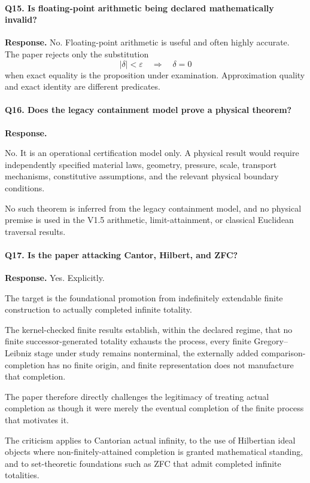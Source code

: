 \documentclass[11pt,a4paper]{article}
\begin{document}
\paragraph{Q15. Is floating-point arithmetic being declared mathematically invalid?}

\textbf{Response.}
No. Floating-point arithmetic is useful and often highly accurate. The
paper rejects only the substitution
\[
|\delta|<\varepsilon
\quad\Longrightarrow\quad
\delta=0
\]
when exact equality is the proposition under examination. Approximation
quality and exact identity are different predicates.

\paragraph{Q16. Does the legacy containment model prove a physical theorem?}

\textbf{Response.}

No.  It is an operational certification model only.  A physical result
would require independently specified material laws, geometry,
pressure, scale, transport mechanisms, constitutive assumptions, and
the relevant physical boundary conditions.

No such theorem is inferred from the legacy containment model, and no
physical premise is used in the V1.5 arithmetic, limit-attainment, or
classical Euclidean traversal results.

\paragraph{Q17. Is the paper attacking Cantor, Hilbert, and ZFC?}

\textbf{Response.}
Yes. Explicitly.

The target is the foundational promotion from indefinitely extendable
finite construction to actually completed infinite totality.

The kernel-checked finite results establish, within the declared
regime, that no finite successor-generated totality exhausts the
process, every finite Gregory--Leibniz stage under study remains
nonterminal, the externally added comparison-completion has no finite origin, and
finite representation does not manufacture that completion.

The paper therefore directly challenges the legitimacy of treating
actual completion as though it were merely the eventual completion of
the finite process that motivates it.

The criticism applies to Cantorian actual infinity, to the use of
Hilbertian ideal objects where non-finitely-attained completion is
granted mathematical standing, and to set-theoretic foundations such
as ZFC that admit completed infinite totalities.
\end{document}
